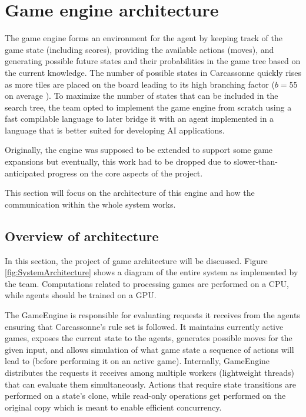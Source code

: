 \section{Game engine architecture}
The game engine forms an environment for the agent by keeping track of the game state
(including scores), providing the available actions (moves), and generating possible
future states and their probabilities in the game tree based on the current knowledge.
The number of possible states in Carcassonne quickly rises as more tiles are placed on
the board leading to its high branching factor ($b = 55$ on average \cite{MasterThesisCarcassonne}).
To maximize the number of states that can be included in the search tree,
the team opted to implement the game engine from scratch using a fast compilable
language to later bridge it with an agent implemented in a language
that is better suited for developing AI applications.

Originally, the engine was supposed to be extended to support some game expansions
but eventually, this work had to be dropped due to slower-than-anticipated progress on
the core aspects of the project.

This section will focus on the architecture of this engine and how the communication within the whole system works.

\subsection{Overview of architecture}

In this section, the project of game architecture will be discussed.
Figure \ref{fig:SystemArchitecture} shows a diagram of the entire system as implemented by the team.
Computations related to processing games are performed on a CPU,
while agents should be trained on a GPU.

\begin{figure*}
	\centering
	\scalebox{.48}{}
	\caption{Diagram of the system's architecture.}
	\label{fig:SystemArchitecture}
\end{figure*}

The GameEngine is responsible for evaluating requests it receives from the agents
ensuring that Carcassonne's rule set is followed. It maintains currently active games,
exposes the current state to the agents, generates possible moves for the given input,
and allows simulation of what game state a sequence of actions will lead to (before performing it
on an active game). Internally, GameEngine distributes the requests it receives among
multiple workers (lightweight threads) that can evaluate them simultaneously. Actions that
require state transitions are performed on a state's clone, while read-only operations
get performed on the original copy which is meant to enable efficient concurrency.


